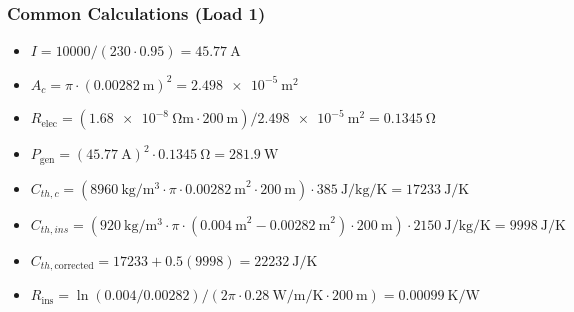 \documentclass[11pt, a4paper]{article}
\begin{document}
\subsubsection{Common Calculations (Load 1)}
\begin{itemize}
    \item $I = 10000 / (230 \cdot 0.95) = \SI{45.77}{\ampere}$
    \item $A_c = \pi \cdot (\SI{0.00282}{\metre})^2 = \SI{2.498e-5}{\square\metre}$
    \item $R_{\text{elec}} = (\SI{1.68e-8}{\ohm\metre} \cdot \SI{200}{\metre}) / \SI{2.498e-5}{\square\metre} = \SI{0.1345}{\ohm}$
    \item $P_{\text{gen}} = (\SI{45.77}{\ampere})^2 \cdot \SI{0.1345}{\ohm} = \SI{281.9}{\watt}$
    \item $C_{th,c} = (\SI{8960}{\kilogram\per\cubic\metre} \cdot \pi \cdot \SI{0.00282}{\metre}^2 \cdot \SI{200}{\metre}) \cdot \SI{385}{\joule\per\kilogram\per\kelvin} = \SI{17233}{\joule\per\kelvin}$
    \item $C_{th,ins} = (\SI{920}{\kilogram\per\cubic\metre} \cdot \pi \cdot (\SI{0.004}{\metre}^2 - \SI{0.00282}{\metre}^2) \cdot \SI{200}{\metre}) \cdot \SI{2150}{\joule\per\kilogram\per\kelvin} = \SI{9998}{\joule\per\kelvin}$
    \item $C_{th,\text{corrected}} = 17233 + 0.5(9998) = \SI{22232}{\joule\per\kelvin}$
    \item $R_{\text{ins}} = \ln(0.004/0.00282) / (2\pi \cdot \SI{0.28}{\watt\per\metre\per\kelvin} \cdot \SI{200}{\metre}) = \SI{0.00099}{\kelvin\per\watt}$
\end{itemize}
\end{document}
